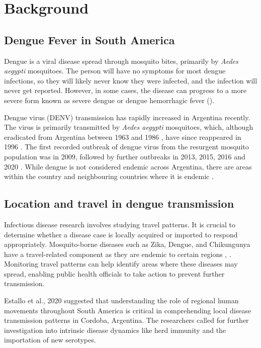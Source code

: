 \section{Background}


\subsection{Dengue Fever in South America}

Dengue is a viral disease spread through mosquito bites, primarily by \textit{Aedes aegypti} mosquitoes. The person will have no symptoms for most dengue infections, so they will likely never know they were infected, and the infection will never get reported. However, in some cases, the disease can progress to a more severe form known as severe dengue or dengue hemorrhagic fever (\cite{noauthor_dengue_2022}).

Dengue virus (DENV) transmission has rapidly increased in Argentina recently. The virus is primarily transmitted by \textit{Aedes aegypti} mosquitoes, which, although eradicated from Argentina between 1963 and 1986 \cite{curto_reinfestacion_2002}, have since reappeared in 1996 \cite{almiron_aedes_1998}. The first recorded outbreak of dengue virus from the resurgent mosquito population was in 2009, followed by further outbreaks in 2013, 2015, 2016 and 2020 \cite{robert_arbovirus_2019}. While dengue is not considered endemic across Argentina, there are areas within the country and neighbouring countries where it is endemic \cite{robert_arbovirus_2019}.
\subsection{Location and travel in dengue transmission}

Infectious disease research involves studying travel patterns. It is crucial to determine whether a disease case is locally acquired or imported to respond appropriately. Mosquito-borne diseases such as Zika, Dengue, and Chikungunya have a travel-related component as they are endemic to certain regions \cite{queiroz_overlap_2022}, \cite{noauthor_dengue_2022}. Monitoring travel patterns can help identify areas where these diseases may spread, enabling public health officials to take action to prevent further transmission. 

Estallo et al., 2020 suggested that understanding the role of regional human movements throughout South America is critical in comprehending local disease transmission patterns in Cordoba, Argentina. The researchers called for further investigation into intrinsic disease dynamics like herd immunity and the importation of new serotypes.

